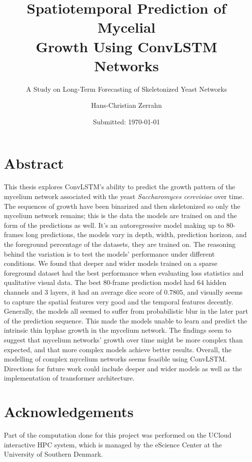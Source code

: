 \documentclass[a4paper,12pt]{article}
\author{Hans-Christian Zerrahn}
\title{Spatiotemporal Prediction of Mycelial\\Growth Using ConvLSTM Networks}
\subtitle{A Study on Long-Term Forecasting of Skeletonized Yeast Networks}
\date{Submitted: \today}
\begin{document}
\begingroup
  \selectfont
  \maketitle
\endgroup

\section{Abstract}
This thesis explores ConvLSTM's ability to predict the growth pattern of the mycelium network associated with the yeast \textit{Saccharomyces cerevisiae} over time. The sequences of growth have been binarized and then skeletonized so only the mycelium network remains; this is the data the models are trained on and the form of the predictions as well.
It's an autoregressive model making up to $80$-frames long predictions, the models vary in depth, width, prediction horizon, and the foreground percentage of the datasets, they are trained on. The reasoning behind the variation is to test the models' performance under different conditions.
We found that deeper and wider models trained on a sparse foreground dataset had the best performance when evaluating loss statistics and qualitative visual data. The best $80$-frame prediction model had $64$ hidden channels and $3$ layers, it had an average dice score of $0.7805$, and visually seems to capture the spatial features very good and the temporal features decently.
Generally, the models all seemed to suffer from probabilistic blur in the later part of the prediction sequence. This made the models unable to learn and predict the intrinsic thin hyphae growth in the mycelium network. The findings seem to suggest that mycelium networks' growth over time might be more complex than expected, and that more complex models achieve better results.
Overall, the modelling of complex mycelium networks seems feasible using ConvLSTM. Directions for future work could include deeper and wider models as well as the implementation of transformer architecture.


\section{Acknowledgements}
Part of the computation done for this project was performed on the UCloud interactive HPC system, which is managed by the eScience Center at the University of Southern Denmark.
\newpage
\tableofcontents %
\newpage %
\end{document}
